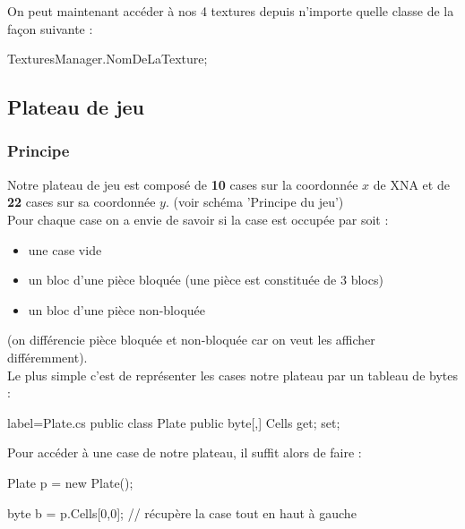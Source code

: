 \documentclass[a4paper]{article}
\begin{document}
\vspace{0.2cm}
On peut maintenant accéder à nos 4 textures depuis n'importe quelle classe de
la façon suivante : \\

\begin{csharpcode}
TexturesManager.NomDeLaTexture;
\end{csharpcode}

\subsection{Plateau de jeu}

\subsubsection{Principe}

Notre plateau de jeu est composé de \textbf{10} cases sur la coordonnée $x$ de
XNA et de \textbf{22} cases sur sa coordonnée $y$. (voir schéma 'Principe du jeu')\\
Pour chaque case on a envie de savoir si la case est occupée par soit :

\begin{itemize}
    \item une case vide
    \item un bloc d'une pièce bloquée (une pièce est constituée de 3 blocs)
    \item un bloc d'une pièce non-bloquée
\end{itemize}

(on différencie pièce bloquée et non-bloquée car on veut les afficher
différemment). \\

Le plus simple c'est de représenter les cases notre plateau par un tableau de
bytes : \\

\begin{csharpcode*}{label=Plate.cs}
public class Plate
{
    public byte[,] Cells { get; set; }
}
\end{csharpcode*}

\vspace{0.2cm}

Pour accéder à une case de notre plateau, il suffit alors de faire : \\

\begin{csharpcode}
Plate p = new Plate();

byte b = p.Cells[0,0]; // récupère la case tout en haut à gauche
\end{csharpcode}
\end{document}
